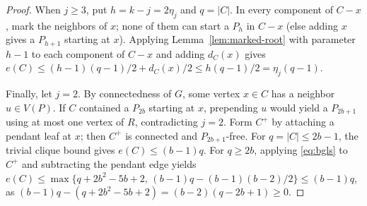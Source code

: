 \documentclass[10pt]{article}
\theoremstyle{compactplain}
\theoremstyle{remark}\newtheorem{remark}[theorem]{Remark}
\begin{document}
\begin{proof}
When $j\ge3$, put $h=k-j=2\eta_j$ and $q=|C|$. In every component of
$C-x$, mark the neighbors of $x$; none of them can start a $P_h$ in
$C-x$ (else adding $x$ gives a $P_{h+1}$ starting at $x$). Applying
Lemma~\ref{lem:marked-root} with parameter $h-1$ to each component of
$C-x$ and adding $d_C(x)$ gives
$e(C)\le(h-1)(q-1)/2+d_C(x)/2\le h(q-1)/2=\eta_j(q-1)$.

Finally, let $j=2$. By connectedness of $G$, some vertex $x\in C$ has a
neighbor $u\in V(P)$. If $C$ contained a $P_{2b}$ starting at $x$,
prepending $u$ would yield a $P_{2b+1}$ using at most one vertex of $R$,
contradicting $j=2$. Form $C^+$ by attaching a pendant leaf at $x$; then
$C^+$ is connected and $P_{2b+1}$-free. For $q=|C|\le2b-1$, the trivial
clique bound gives $e(C)\le(b-1)q$. For $q\ge2b$, applying
\eqref{eq:bgls} to $C^+$ and subtracting the pendant edge yields
$e(C)\le\max\{q+2b^2-5b+2,\,(b-1)q-(b-1)(b-2)/2\}\le(b-1)q$, as
$(b-1)q-(q+2b^2-5b+2)=(b-2)(q-2b+1)\ge0$.
\end{proof}
\end{document}

